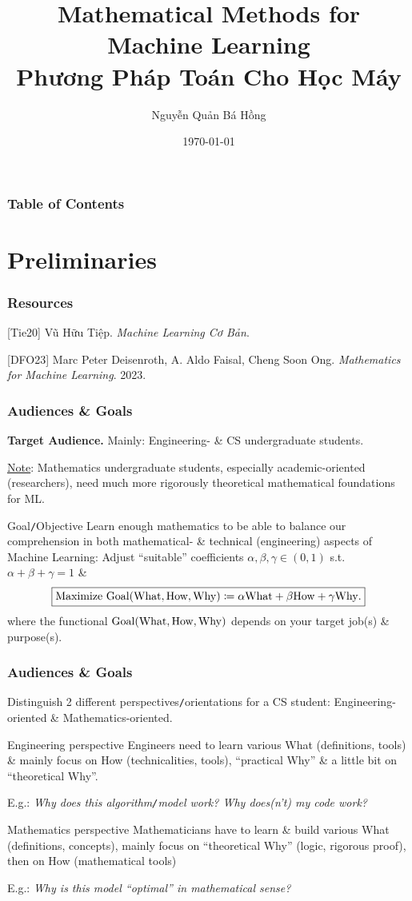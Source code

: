 \documentclass{beamer}
\title{Mathematical Methods for Machine Learning\\Phương Pháp Toán Cho Học Máy}
\author{\sc Nguyễn Quản Bá Hồng}
\institute{UMT, HCMC -- University of Management \& Technology, Ho Chi Minh City}
\date{\today}
\begin{document}
\frame{\titlepage}
\begin{frame}
	\frametitle{Table of Contents}
	\tableofcontents
\end{frame}

\section{Preliminaries}

\begin{frame}
	\frametitle{Resources}
	[Tie20] {\sc Vũ Hữu Tiệp}. {\it Machine Learning Cơ Bản}.
	\vspace{2mm}
	
	[DFO23] {\sc Marc Peter Deisenroth, A. Aldo Faisal, Cheng Soon Ong}. {\it Mathematics for Machine Learning}. 2023.
\end{frame}

\begin{frame}
	\frametitle{Audiences \& Goals}
	{\bf Target Audience.} Mainly: Engineering- \& CS undergraduate students.
	
	\underline{Note}: Mathematics undergraduate students, especially academic-oriented (researchers), need much more rigorously theoretical mathematical foundations for ML.	
	\begin{block}{Goal{\tt/}Objective}
		Learn enough mathematics to be able to balance our comprehension in both mathematical- \& technical (engineering) aspects of Machine Learning: Adjust ``suitable'' coefficients $\alpha,\beta,\gamma\in(0,1)$ s.t. $\alpha + \beta + \gamma = 1$ \&
		\begin{equation}
			 \boxed{\mbox{Maximize } {\rm Goal}({\rm What,How,Why})\coloneqq\alpha{\rm What} + \beta{\rm How} + \gamma{\rm Why}.}
		\end{equation}
		where the functional ${\rm Goal}({\rm What,How,Why})$ depends on your target job(s) \& purpose(s).
	\end{block}
\end{frame}

\begin{frame}
	\frametitle{Audiences \& Goals}
	Distinguish 2 different perspectives{\tt/}orientations for a CS student: Engineering-oriented \& Mathematics-oriented.
	\begin{block}{Engineering perspective}
		Engineers need to learn various What (definitions, tools) \& mainly focus on How (technicalities, tools), ``practical Why'' \& a little bit on ``theoretical Why''.
	\end{block}
	E.g.: {\it Why does this algorithm{\tt/}model work? Why does(n't) my code work?}
	
	\begin{block}{Mathematics perspective}
		Mathematicians have to learn \& build various What (definitions, concepts), mainly focus on ``theoretical Why'' (logic, rigorous proof), then on How (mathematical tools)
	\end{block}
	E.g.: {\it Why is this model ``optimal'' in mathematical sense?}
\end{frame}
\end{document}
